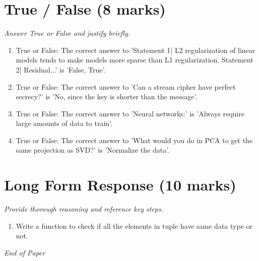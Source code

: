 \documentclass[12pt]{article}
\begin{document}
\section*{True / False (8 marks)}
\textit{Answer True or False and justify briefly.}
\begin{enumerate}[label=\arabic*.]
\item True or False: The correct answer to 'Statement 1| L2 regularization of linear models tends to make models more sparse than L1 regularization. Statement 2| Residual...' is 'False, True'.
\item True or False: The correct answer to 'Can a stream cipher have perfect secrecy?' is 'No, since the key is shorter than the message'.
\item True or False: The correct answer to 'Neural networks:' is 'Always require large amounts of data to train'.
\item True or False: The correct answer to 'What would you do in PCA to get the same projection as SVD?' is 'Normalize the data'.
\end{enumerate}

\section*{Long Form Response (10 marks)}
\textit{Provide thorough reasoning and reference key steps.}
\begin{enumerate}[label=\arabic*.]
\item Write a function to check if all the elements in tuple have same data type or not.
\end{enumerate}

\vfill
\noindent\textit{End of Paper}
\end{document}
